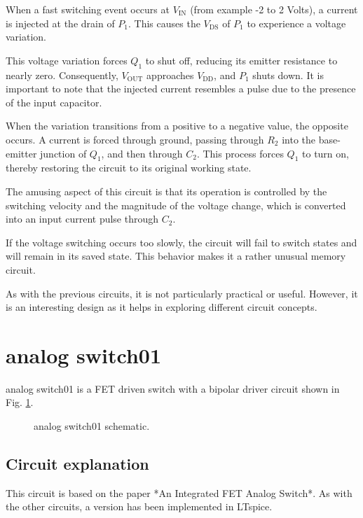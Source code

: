 \documentclass[12pt]{article}
\begin{document}
When a fast switching event occurs at $V_{\text{IN}}$ (from example -2 to 2 Volts), a current is injected at the drain of $P_1$. This causes the $V_{\text{DS}}$ of $P_1$ to experience a voltage variation.  

This voltage variation forces $Q_1$ to shut off, reducing its emitter resistance to nearly zero. Consequently, $V_{\text{OUT}}$ approaches $V_{\text{DD}}$, and $P_1$ shuts down. It is important to note that the injected current resembles a pulse due to the presence of the input capacitor.  

When the variation transitions from a positive to a negative value, the opposite occurs. A current is forced through ground, passing through $R_2$ into the base-emitter junction of $Q_1$, and then through $C_2$. This process forces $Q_1$ to turn on, thereby restoring the circuit to its original working state.  


The amusing aspect of this circuit is that its operation is controlled by the switching velocity and the magnitude of the voltage change, which is converted into an input current pulse through $C_2$.  

If the voltage switching occurs too slowly, the circuit will fail to switch states and will remain in its saved state. This behavior makes it a rather unusual memory circuit.  

As with the previous circuits, it is not particularly practical or useful. However, it is an interesting design as it helps in exploring different circuit concepts.






\newpage


\section{analog switch01}



analog switch01 is a FET driven switch with a bipolar driver circuit shown in Fig. \ref{analogswitch01}. 

\begin{figure}[H]
        \centering
        
        \caption{analog switch01 schematic.}
        \label{analogswitch01}
\end{figure}

\subsection{Circuit explanation}
This circuit is based on the paper *An Integrated FET Analog Switch*.  
As with the other circuits, a version has been implemented in LTspice.  
\end{document}
